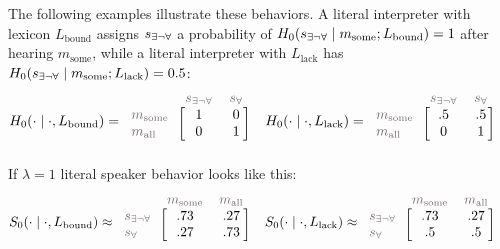 \documentclass[a4paper, 11pt]{article}
\theoremstyle{Satz}
\newcommand{\state}{\ensuremath{s}\xspace}		%
\newcommand{\mystate}[1]{\ensuremath{\state_{\text{#1}}}\xspace} %
\newcommand{\mylang}[1]{\ensuremath{L_{\text{#1}}}\xspace} %
\newcommand{\messg}{\ensuremath{m}\xspace}		%
\newcommand{\mymessg}[1]{\ensuremath{\messg_{\text{#1}}}\xspace} %
\newcommand{\ssome}{\mystate{\ensuremath{\exists\neg\forall}}}
\newcommand{\sall}{\mystate{\ensuremath{\forall}}}
\newcommand{\msome}{\mymessg{some}}
\newcommand{\mall}{\mymessg{all}}
\newcommand{\Lbound}{\mylang{bound}}
\newcommand{\Llack}{\mylang{lack}}
\newcommand{\mygray}[1]{{\textcolor{mygray}{#1}}}
\begin{document}
The following examples illustrate these behaviors. A literal interpreter with lexicon $\Lbound$ assigns $\ssome$
a probability of $H_0(\ssome \mid \msome; \Lbound) = 1$ after hearing $\msome$, while a literal
interpreter with $\Llack$ has $H_0(\ssome \mid \msome; \Llack) = 0.5$:
\begin{align*}
  H_0(\cdot \mid \cdot, \Lbound) & = \begin{blockarray}{lcc}
    & \mygray{\ssome} & \mygray{\sall} \\
    \begin{block}{l[cc]}
      \mygray{\msome} & 1 & 0 \\
      \mygray{\mall}  & 0 & 1 \\
    \end{block}
  \end{blockarray} &
  H_0(\cdot \mid \cdot, \Llack) & = \begin{blockarray}{lcc}
    & \mygray{\ssome} & \mygray{\sall} \\
    \begin{block}{l[cc]}
      \mygray{\msome} & .5 & .5 \\
      \mygray{\mall}  & 0 & 1 \\
    \end{block}
  \end{blockarray} 
\end{align*}
If $\lambda = 1$ literal speaker behavior looks like this:
\begin{align*}
  S_0(\cdot \mid \cdot, \Lbound) & \approx \begin{blockarray}{lcc}
    & \mygray{\msome} & \mygray{\mall} \\
    \begin{block}{l[cc]}
      \mygray{\ssome} & .73 & .27 \\
      \mygray{\sall}  & .27 & .73 \\
    \end{block}
  \end{blockarray} &
  S_0(\cdot \mid \cdot, \Llack) & \approx \begin{blockarray}{lcc}
    & \mygray{\msome} & \mygray{\mall} \\
    \begin{block}{l[cc]}
      \mygray{\ssome} & .73 & .27 \\
      \mygray{\sall}  & .5 & .5 \\
    \end{block}
  \end{blockarray} 
\end{align*}
\end{document}
